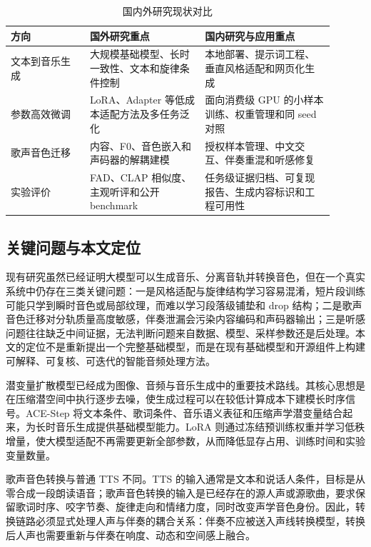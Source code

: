 \documentclass[UTF8,a4paper,zihao=-4,fontset=none]{ctexart}
\begin{document}
\begin{table}[H]
\centering
\caption{国内外研究现状对比}
\small
\begin{tabular}{p{0.22\linewidth}p{0.32\linewidth}p{0.36\linewidth}}
\toprule
方向 & 国外研究重点 & 国内研究与应用重点 \\
\midrule
文本到音乐生成 & 大规模基础模型、长时一致性、文本和旋律条件控制 & 本地部署、提示词工程、垂直风格适配和网页化生成 \\
参数高效微调 & LoRA、Adapter 等低成本适配方法及多任务泛化 & 面向消费级 GPU 的小样本训练、权重管理和同 seed 对照 \\
歌声音色迁移 & 内容、F0、音色嵌入和声码器的解耦建模 & 授权样本管理、中文交互、伴奏重混和听感修复 \\
实验评价 & FAD、CLAP 相似度、主观听评和公开 benchmark & 任务级证据归档、可复现报告、生成内容标识和工程可用性 \\
\bottomrule
\end{tabular}
\end{table}
\subsection{关键问题与本文定位}
现有研究虽然已经证明大模型可以生成音乐、分离音轨并转换音色，但在一个真实系统中仍存在三类关键问题：一是风格适配与旋律结构学习容易混淆，短片段训练可能只学到瞬时音色或局部纹理，而难以学习段落级铺垫和 drop 结构；二是歌声音色迁移对分轨质量高度敏感，伴奏泄漏会污染内容编码和声码器输出；三是听感问题往往缺乏中间证据，无法判断问题来自数据、模型、采样参数还是后处理。本文的定位不是重新提出一个完整基础模型，而是在现有基础模型和开源组件上构建可解释、可复核、可迭代的智能音频处理方法。

潜变量扩散模型已经成为图像、音频与音乐生成中的重要技术路线。其核心思想是在压缩潜空间中执行逐步去噪，使生成过程可以在较低计算成本下建模长时序信号。ACE-Step 将文本条件、歌词条件、音乐语义表征和压缩声学潜变量结合起来，为长时音乐生成提供基础模型能力。LoRA 则通过冻结预训练权重并学习低秩增量，使大模型适配不再需要更新全部参数，从而降低显存占用、训练时间和实验变量数量。

歌声音色转换与普通 TTS 不同。TTS 的输入通常是文本和说话人条件，目标是从零合成一段朗读语音；歌声音色转换的输入是已经存在的源人声或源歌曲，要求保留歌词时序、咬字节奏、旋律走向和情绪力度，同时改变声学音色身份。因此，转换链路必须显式处理人声与伴奏的耦合关系：伴奏不应被送入声线转换模型，转换后人声也需要重新与伴奏在响度、动态和空间感上融合。
\end{document}
